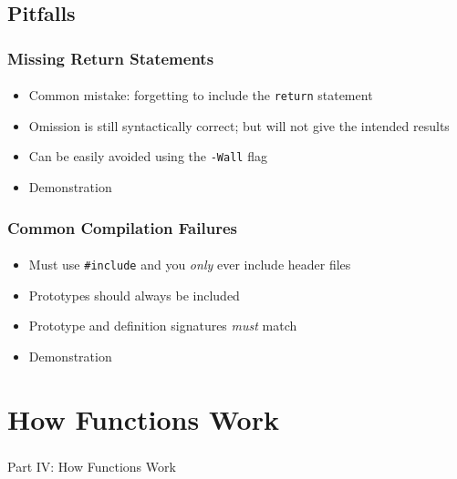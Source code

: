 \documentclass[]{beamer}
\begin{document}
\subsection{Pitfalls}

\begin{frame}[fragile]
  \frametitle{Missing Return Statements}
  \framesubtitle{}

\begin{itemize}[<+->]
  \item Common mistake: forgetting to include the \texttt{return} statement
  \item Omission is still syntactically correct; but will not give the intended results
  \item Can be easily avoided using the \texttt{-Wall} flag
  \item Demonstration
\end{itemize}

\end{frame}

\begin{frame}[fragile]
  \frametitle{Common Compilation Failures}
  \framesubtitle{}

\begin{itemize}[<+->]
  \item Must use \texttt{#include} and you \emph{only} ever include header files
  \item Prototypes should always be included
  \item Prototype and definition signatures \emph{must} match
  \item Demonstration
\end{itemize}

\end{frame}


\section{How Functions Work}

\begin{frame}
    \frametitle{}
    \framesubtitle{}
    
    \begin{center}
    {\Huge Part IV: How Functions Work}\\
    {\Large ~}
    \end{center}

\end{frame}
\end{document}

